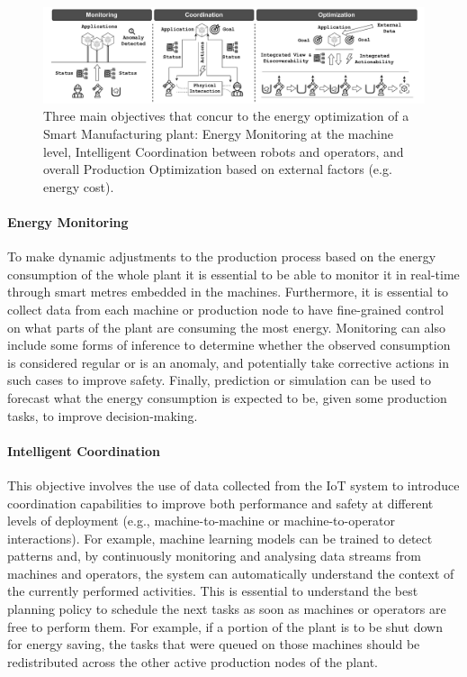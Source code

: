 \begin{figure}
    \centering
    \includegraphics[width=\columnwidth]{figures/dt-mas/target_functions.pdf}
    \caption{Three main objectives that concur to the energy optimization of a Smart Manufacturing plant: Energy Monitoring at the machine level, Intelligent Coordination between robots and operators, and overall Production Optimization based on external factors (e.g. energy cost).}
    \label{fig:target_functions}
\end{figure}

\paragraph{Energy Monitoring}
To make dynamic adjustments to the production process based on the energy consumption of the whole plant it is essential to be able to monitor it in real-time through smart metres embedded in the machines.
Furthermore, it is essential to collect data from each machine or production node to have fine-grained control on what parts of the plant are consuming the most energy.
%
Monitoring can also include some forms of inference to determine whether the observed consumption is considered regular or is an anomaly, and potentially take corrective actions in such cases to improve safety.
%
Finally, prediction or simulation can be used to forecast what the energy consumption is expected to be, given some production tasks, to improve decision-making.

\paragraph{Intelligent Coordination}
This objective involves the use of data collected from the IoT system to introduce coordination capabilities to improve both performance and safety at different levels of deployment (e.g., machine-to-machine or machine-to-operator interactions).
%
For example, machine learning models can be trained to detect patterns and, by continuously monitoring and analysing data streams from machines and operators, the system can automatically understand the context of the currently performed activities.
%
This is essential to understand the best planning policy to schedule the next tasks as soon as machines or operators are free to perform them.
%
%
%
For example, if a portion of the plant is to be shut down for energy saving, the tasks that were queued on those machines should be redistributed across the other active production nodes of the plant.

